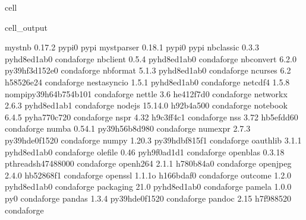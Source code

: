 \documentclass[letterpaper,table,10pt,english]{jupyterBook}
\begin{document}
\begin{sphinxuseclass}{cell}
\begin{sphinxVerbatimOutput}
\begin{sphinxuseclass}{cell_output}
\begin{sphinxVerbatim}[commandchars=\\\{\}]
myst\PYGZhy{}nb                   0.17.2                   pypi\PYGZus{}0    pypi
myst\PYGZhy{}parser               0.18.1                   pypi\PYGZus{}0    pypi
nbclassic                 0.3.3              pyhd8ed1ab\PYGZus{}0    conda\PYGZhy{}forge
nbclient                  0.5.4              pyhd8ed1ab\PYGZus{}0    conda\PYGZhy{}forge
nbconvert                 6.2.0            py39hf3d152e\PYGZus{}0    conda\PYGZhy{}forge
nbformat                  5.1.3              pyhd8ed1ab\PYGZus{}0    conda\PYGZhy{}forge
ncurses                   6.2                  h58526e2\PYGZus{}4    conda\PYGZhy{}forge
nest\PYGZhy{}asyncio              1.5.1              pyhd8ed1ab\PYGZus{}0    conda\PYGZhy{}forge
netcdf4                   1.5.8           nompi\PYGZus{}py39h64b754b\PYGZus{}101    conda\PYGZhy{}forge
nettle                    3.6                  he412f7d\PYGZus{}0    conda\PYGZhy{}forge
networkx                  2.6.3              pyhd8ed1ab\PYGZus{}1    conda\PYGZhy{}forge
nodejs                    15.14.0              h92b4a50\PYGZus{}0    conda\PYGZhy{}forge
notebook                  6.4.5              pyha770c72\PYGZus{}0    conda\PYGZhy{}forge
nspr                      4.32                 h9c3ff4c\PYGZus{}1    conda\PYGZhy{}forge
nss                       3.72                 hb5efdd6\PYGZus{}0    conda\PYGZhy{}forge
numba                     0.54.1           py39h56b8d98\PYGZus{}0    conda\PYGZhy{}forge
numexpr                   2.7.3            py39hde0f152\PYGZus{}0    conda\PYGZhy{}forge
numpy                     1.20.3           py39hdbf815f\PYGZus{}1    conda\PYGZhy{}forge
oauthlib                  3.1.1              pyhd8ed1ab\PYGZus{}0    conda\PYGZhy{}forge
olefile                   0.46               pyh9f0ad1d\PYGZus{}1    conda\PYGZhy{}forge
openblas                  0.3.18          pthreads\PYGZus{}h4748800\PYGZus{}0    conda\PYGZhy{}forge
openh264                  2.1.1                h780b84a\PYGZus{}0    conda\PYGZhy{}forge
openjpeg                  2.4.0                hb52868f\PYGZus{}1    conda\PYGZhy{}forge
openssl                   1.1.1o               h166bdaf\PYGZus{}0    conda\PYGZhy{}forge
outcome                   1.2.0              pyhd8ed1ab\PYGZus{}0    conda\PYGZhy{}forge
packaging                 21.0               pyhd8ed1ab\PYGZus{}0    conda\PYGZhy{}forge
pamela                    1.0.0                      py\PYGZus{}0    conda\PYGZhy{}forge
pandas                    1.3.4            py39hde0f152\PYGZus{}0    conda\PYGZhy{}forge
pandoc                    2.15                 h7f98852\PYGZus{}0    conda\PYGZhy{}forge

\end{sphinxVerbatim}
\end{sphinxuseclass}
\end{sphinxVerbatimOutput}
\end{sphinxuseclass}
\end{document}
